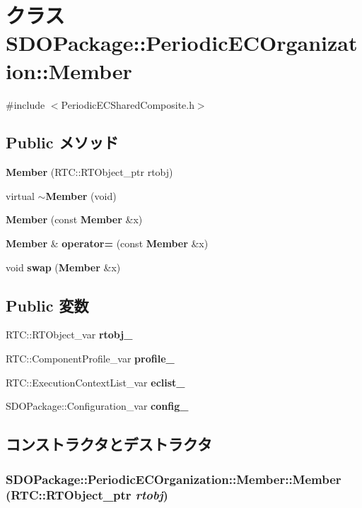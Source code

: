 \section{クラス SDOPackage::PeriodicECOrganization::Member}
\label{classSDOPackage_1_1PeriodicECOrganization_1_1Member}


{\ttfamily \#include $<$PeriodicECSharedComposite.h$>$}

\subsection*{Public メソッド}
\begin{DoxyCompactItemize}
\item 
{\bf Member} (RTC::RTObject\_\-ptr rtobj)
\item 
virtual {\bf $\sim$Member} (void)
\item 
{\bf Member} (const {\bf Member} \&x)
\item 
{\bf Member} \& {\bf operator=} (const {\bf Member} \&x)
\item 
void {\bf swap} ({\bf Member} \&x)
\end{DoxyCompactItemize}
\subsection*{Public 変数}
\begin{DoxyCompactItemize}
\item 
RTC::RTObject\_\-var {\bf rtobj\_\-}
\item 
RTC::ComponentProfile\_\-var {\bf profile\_\-}
\item 
RTC::ExecutionContextList\_\-var {\bf eclist\_\-}
\item 
SDOPackage::Configuration\_\-var {\bf config\_\-}
\end{DoxyCompactItemize}


\subsection{コンストラクタとデストラクタ}
\subsubsection[{Member}]{\setlength{\rightskip}{0pt plus 5cm}SDOPackage::PeriodicECOrganization::Member::Member (RTC::RTObject\_\-ptr {\em rtobj})\hspace{0.3cm}{\ttfamily  [inline]}}\label{classSDOPackage_1_1PeriodicECOrganization_1_1Member_ac2bb9e4a4943be8eac8d3ae10a281c0f}


